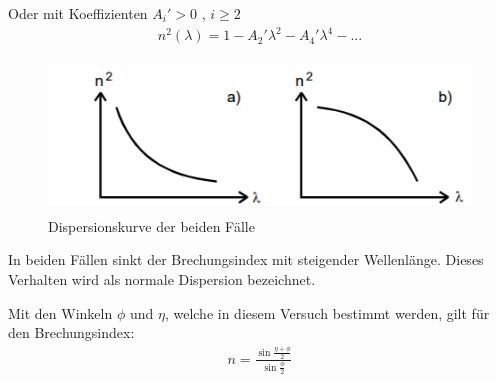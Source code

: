 Oder mit Koeffizienten $A_i' > 0$ , $i \geq 2$
\begin{align}
  {n}^2 (\lambda) = 1 - A_2' \lambda^2 - A_4' \lambda^4 - ...
\end{align}

\begin{figure}[H]
  \centering
  \includegraphics[height=4cm]{dispersion.PNG}
  \caption{Dispersionskurve der beiden Fälle \cite{sample}}
  \label{fig:biegungbild1}
\end{figure}

In beiden Fällen sinkt der Brechungsindex mit steigender Wellenlänge. Dieses Verhalten wird als normale Dispersion bezeichnet.

Mit den Winkeln $\phi$ und $\eta$, welche in diesem Versuch bestimmt werden, gilt für den Brechungsindex:
\begin{align}
  n = \frac{ \sin{\frac{ \eta + \phi }{2}} }{ \sin{\frac{ \phi }{2}} }
\end{align}
